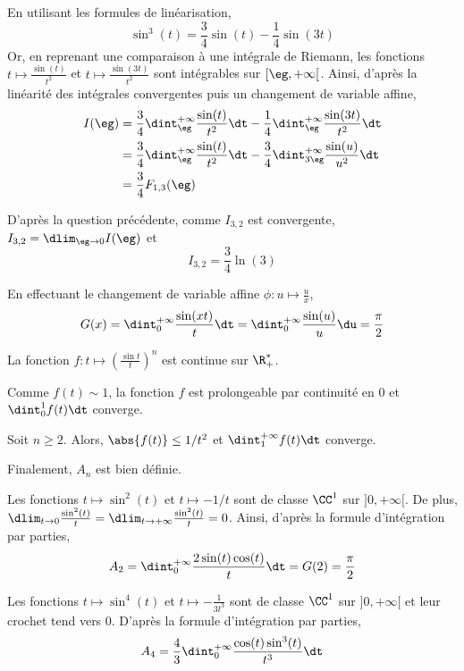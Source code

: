 \begin{solution}
\Qu En utilisant les formules de linéarisation,
\[
\sin^3(t) = \frac{3}{4} \sin(t) - \frac{1}{4} \sin(3 t)
\]
Or, en reprenant une comparaison à une intégrale de Riemann, les fonctions $t \mapsto \frac{\sin(t)}{t^2}$ et $t \mapsto \frac{\sin(3 t)}{t^2}$ sont intégrables sur $[\eg, +\infty[$. Ainsi, d'après la linéarité des intégrales convergentes puis un changement de variable affine,
\begin{align*}
I(\eg) &= \frac{3}{4} \dint_\eg^{+\infty} \frac{\sin(t)}{t^2} \dt - \frac{1}{4} \dint_\eg^{+\infty} \frac{\sin(3 t)}{t^2} \dt \\
&= \frac{3}{4} \dint_\eg^{+\infty} \frac{\sin(t)}{t^2} \dt - \frac{3}{4} \dint_{3 \eg}^{+\infty} \frac{\sin(u)}{u^2} \dt \\
&= \frac{3}{4} F_{1,3}(\eg)
\end{align*}

\squ D'après la question précédente, comme $I_{3,2}$ est convergente, $I_{3,2} = \dlim_{\eg\to 0} I(\eg)$ et
\[
I_{3,2} = \frac{3}{4} \ln(3)
\]

\qu En effectuant le changement de variable affine $\phi : u \mapsto \frac{u}{x}$,
\[
G(x) = \dint_0^{+\infty} \frac{\sin(x t)}{t} \dt = \dint_0^{+\infty} \frac{\sin(u)}{u} \du = \frac{\pi}{2}
\]

\qu La fonction $f : t \mapsto \left(\frac{\sin t}{t}\right)^n$ est continue sur $\R_+^*$.

 Comme $f(t) \sim 1$, la fonction $f$ est prolongeable par continuité en $0$ et $\dint_0^1 f(t) \dt$ converge.

 Soit $n \geq 2$. Alors, $\abs{f(t)} \leq 1/t^2$ et $\dint_1^{+\infty} f(t) \dt$ converge.

Finalement, $A_n$ est bien définie.

\qu Les fonctions $t \mapsto \sin^2(t)$ et $t \mapsto -1/t$ sont de classe $\CC^1$ sur $]0, +\infty[$. De plus, $\dlim_{t\to0} \frac{\sin^2(t)}{t} = \dlim_{t\to+\infty} \frac{\sin^2(t)}{t} = 0$. Ainsi, d'après la formule d'intégration par parties,
\[
A_2 = \dint_0^{+\infty} \frac{2 \sin(t) \cos(t)}{t} \dt = G(2) = \frac{\pi}{2}
\]

\qu Les fonctions $t \mapsto \sin^4(t)$ et $t \mapsto -\frac{1}{3t^3}$ sont de classe $\CC^1$ sur $]0, +\infty[$ et leur crochet tend vers $0$. D'après la formule d'intégration par parties,
\[
A_4 = \frac{4}{3} \dint_0^{+\infty} \frac{\cos(t) \sin^3(t)}{t^3} \dt
\]


\end{solution}
